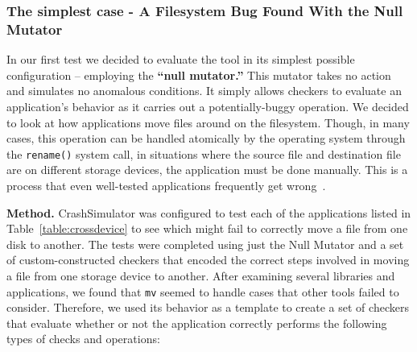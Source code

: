 \subsubsection{The simplest case - A Filesystem Bug Found With the Null Mutator}
\label{sec-move-bugs}
In our first test we decided to evaluate the tool in its simplest possible
configuration -- employing the {\bf ``null mutator.''}
This mutator takes no action and simulates no anomalous conditions.
It simply allows checkers to evaluate an application's behavior
as it carries out a potentially-buggy operation.
We decided to look at how applications
move files around on the filesystem.
Though, in many cases, this operation can be handled
atomically by the operating system
through the {\tt rename()} system call, in situations where the source file and destination file are on different storage devices,
the application must be done
manually.
This is a process
that even well-tested applications
frequently get wrong~\cite{PHPRenameBug,PythonShutilBug,NodejsCopyBug}.

{\bf Method.}
CrashSimulator was configured
to test each of the applications listed in Table~\ref{table:crossdevice}
to see which might fail to correctly move a file from one disk to another. The tests were completed using just the Null Mutator and a set of custom-constructed checkers that encoded the correct steps involved in moving a file from one
storage device to another.
After examining several libraries and applications,
we found that
{\tt mv} seemed to handle cases that other tools failed to consider.
Therefore, we
used its behavior as a template to create a set of checkers
that evaluate whether or not
the application correctly performs the following
types of checks and operations:

